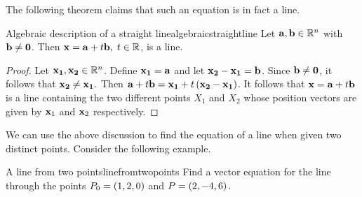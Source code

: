The following theorem claims that such an equation is in fact a line. 

\begin{proposition}{Algebraic description of a straight line}{algebraicstraightline}
Let ${\bf a},{\bf b}\in \mathbb{R}^{n}$ with ${\bf b}\neq {\bf 0}$. 
Then ${\bf x}={\bf a}+t{\bf b},\; t\in \mathbb{R}$, is a
line.
\end{proposition}

\begin{proof}
Let ${\bf x_{1}}, {\bf x_{2}} \in \mathbb{R}^n$. 
Define ${\bf x_{1}}={\bf a}$ and let ${\bf x_{2}}-{\bf x_{1}}={\bf b}$.
Since ${\bf b} \neq {\bf 0}$, it follows that ${\bf x_{2}}\neq {\bf x_{1}}.$ Then
${\bf a}+t{\bf b}={\bf x_{1}} + t\left({\bf x_{2}}-{\bf x_{1}}\right) $. It follows that  
${\bf x}={\bf a}+t{\bf b}$ is a line containing the two different points 
$X_1$ and $X_2$ whose position vectors are given by ${\bf x}_1$ and ${\bf x}_2$ respectively. 
\end{proof}

We can use the above discussion to find the equation of a line when given two distinct points.
Consider the following example. 

\begin{example}{A line from two points}{linefromtwopoints}
Find a vector equation for the line through the points $P_0 = \left(
1,2,0\right) $ and $P = \left(2,-4,6\right).$
\end{example}

